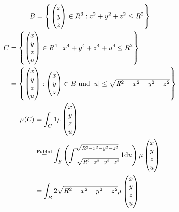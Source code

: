 \begin{bsp*}
	\begin{gather*}
		B = \left\{ \begin{pmatrix} x \\ y \\ z \end{pmatrix} \in R^3 : x^2 + y^2 + z^2 \leq R^2 \right\} \\
		\begin{split}
			C
				&= \left\{ \begin{pmatrix} x \\ y \\ z \\ u \end{pmatrix} \in R^4 : x^4 + y^4 + z^4 + u^4 \leq R^2 \right\} \\
				&= \left\{ \begin{pmatrix} x \\ y \\ z \\ u \end{pmatrix} : \begin{pmatrix} x \\ y \\ z \end{pmatrix} \in B \text{ und } \abs{u} \leq \sqrt{ R^2 - x^2 - y^2 - z^2} \right\}
		\end{split} \\
		\begin{split}
			\mu(C)
				&= \int_C 1 \mu\begin{pmatrix} x \\ y \\ z \\ u \end{pmatrix} \\
				&\overset{\text{\scriptsize{Fubini}}}{=} \int_B \left( \int_{-\sqrt{ R^2 - x^2 - y^2 - z^2}}^{\sqrt{ R^2 - x^2 - y^2 - z^2}} 1 \dd u \right) \mu\begin{pmatrix} x \\ y \\ z \\ u \end{pmatrix} \\
				&= \int_B 2 \sqrt{ R^2 - x^2 - y^2 - z^2} \mu\begin{pmatrix} x \\ y \\ z \\ u \end{pmatrix} \\

\end{split}
\end{gather*}
\end{bsp*}
